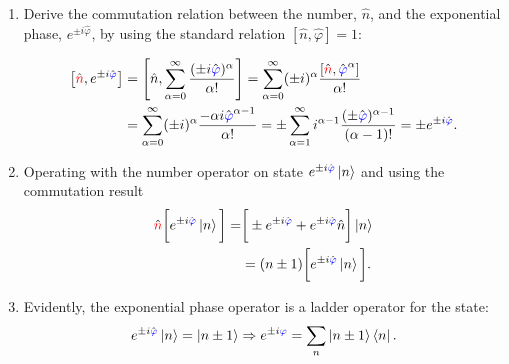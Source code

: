 \begin{enumerate}
\item Derive  the commutation relation  between the number, $  \hat{n} $, and  the exponential
  phase,     $    e^{\pm     i\hat{\varphi}}     $,    by     using     the    standard     relation
  $ \left[\hat{n},\hat{\varphi}\right] = 1 $:
 
  {\scriptsize\begin{equation}\label{eq:ab1}
      \begin{aligned}
        \left[\hat{{\color{red}{n}}}, e^{\pm i \hat{\textcolor{blue}{\varphi}}}\right] & =  \left[\hat{n}, \sum_{\alpha = 0}^{\infty} \frac{(\pm i\hat{\textcolor{blue}{\varphi}})^\alpha}{\alpha!}\right] = \sum_{\alpha = 0}^{\infty} (\pm i)^\alpha\frac{\left[\hat{{\color{red}{n}}}, \hat{\textcolor{blue}{\varphi}}^\alpha\right]}{\alpha!}\\
        &  = \sum_{\alpha  = 0}^{\infty}  (\pm i)^\alpha\frac{-\alpha  i\hat{\textcolor{blue}{\varphi}}^{\alpha -  1}}{\alpha!}  =  \pm \sum_{\alpha  =
          1}^{\infty}i^{\alpha  -  1}\frac{(\pm\hat{\textcolor{blue}{\varphi}})^{\alpha  -  1}}{(\alpha   -  1)!}   =  \pm  e^{\pm
          i\hat{\textcolor{blue}{\varphi}}}.
      \end{aligned}
    \end{equation}}

\item Operating with the number operator on state $ e^{\pm i\hat{\textcolor{blue}{\varphi}}}\ket{n} $ and using
  the commutation result \begin{equation}\label{eq:ab2}
    \begin{aligned}
      \hat{{\color{red}{n}}}\bigg[e^{\pm   i\hat{\textcolor{blue}{\varphi}}}\ket{n}\bigg]    =   &    \bigg[\pm   e^{\pm
        i\hat{\textcolor{blue}{\varphi}}}   +  e^{\pm   i\hat{\textcolor{blue}{\varphi}}}\hat{n}\bigg]\ket{n}  \\   &  =   (n\pm
      1)\bigg[e^{\pm i\hat{\textcolor{blue}{\varphi}}}\ket{n}\bigg].
    \end{aligned}
  \end{equation}

\item Evidently, the exponential phase operator is a ladder operator for the  state:
  \begin{equation}
    \label{eq:ab5}
    e^{\pm i\hat{\textcolor{blue}{\varphi}}}\ket{n} = \ket{n \pm 1} \Rightarrow e^{\pm i\textcolor{blue}{\varphi}} = \sum_{{n}} \ket{n\pm1}\bra{n}.
  \end{equation}
 

\end{enumerate}
